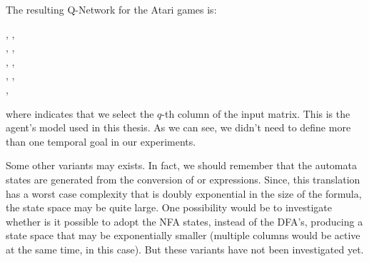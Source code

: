The resulting Q-Network for the Atari games is:
\begin{center}
	, \relu{}, \\
	, \relu{}, \\
	, \relu{}, \\
	, \relu{}, \\
	, \\
\end{center}
where  indicates that we select the $q$-th column of
the input matrix. This is the agent's model used in this thesis. As we can
see, we didn't need to define more than one temporal goal in our experiments.

Some other variants may exists. In fact, we should remember that the automata
states are generated from the conversion of  \ldl{} or \ltl{} expressions.
Since, this translation has a worst case complexity that is doubly exponential
in the size of the formula, the state space may be quite large. One
possibility would be to investigate whether is it possible to adopt the NFA
states, instead of the DFA's, producing a state space that may be
exponentially smaller (multiple columns would be active at the same time, in
this case). But these variants have not been investigated yet.

